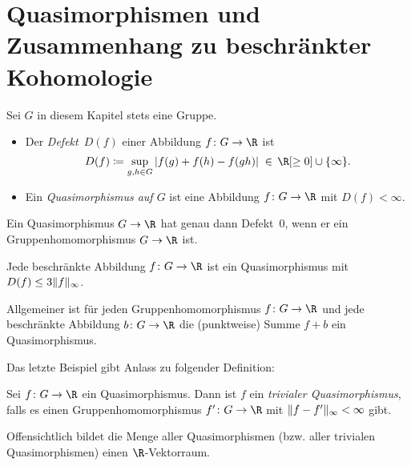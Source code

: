 \chapter{Quasimorphismen und Zusammenhang zu beschränkter Kohomologie}
\begin{thSetup}
    Sei $G$ in diesem Kapitel stets eine Gruppe.
\end{thSetup}

\begin{thDef} \label{qmor:def} \hfill
    \begin{itemize}
        \item
            Der \emph{Defekt~$D(f)$} einer Abbildung $f\colon G\to\R$
            ist
            \[ D(f) \defeq \sup_{g,h\in G}\, \abs{f(g) + f(h) - f(gh)}
                \;\in\, \R[\geq0] \cup \{\infty\}
            . \]
            
        \item
            Ein \emph{Quasimorphismus auf $G$} ist eine
            Abbildung $f\colon G\to\R$ mit $D(f) < \infty$.
    \end{itemize}
\end{thDef}

\begin{BspList}
\item
    Ein Quasimorphismus $G\to\R$ hat genau dann Defekt~$0$, wenn er ein
    Gruppenhomomorphismus $G\to\R$ ist.

\item
    Jede beschränkte Abbildung $f\colon G\to\R$ ist ein
    Quasimorphismus mit $D(f) \leq 3\lVert f\rVert_\infty$.

\item
    Allgemeiner ist für jeden Gruppenhomomorphismus $f\colon G\to\R$ und
    jede beschränkte Abbildung $b\colon G\to\R$ die (punktweise) Summe $f+b$
    ein Quasimorphismus.
\end{BspList}

Das letzte Beispiel gibt Anlass zu folgender Definition:

\begin{thDef}
    Sei $f\colon G\to\R$ ein Quasimorphismus. Dann ist $f$ ein \emph{trivialer
    Quasimorphismus}, falls es einen Gruppenhomomorphismus $f'\colon G\to\R$
    mit $\lVert f-f'\rVert_\infty < \infty$ gibt.
\end{thDef}

Offensichtlich bildet die Menge aller Quasimorphismen (bzw. aller trivialen
Quasimorphismen) einen $\R$-Vektorraum.

